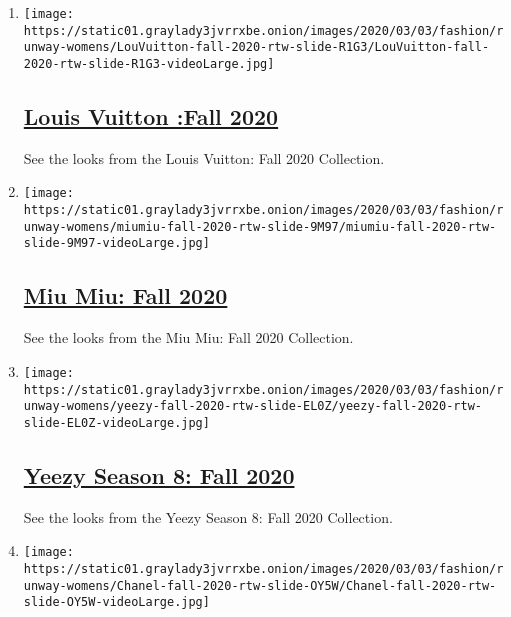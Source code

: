 \begin{enumerate}
\def\labelenumi{\arabic{enumi}.}
\item
  \texttt{[image: https://static01.graylady3jvrrxbe.onion/images/2020/03/03/fashion/runway-womens/LouVuitton-fall-2020-rtw-slide-R1G3/LouVuitton-fall-2020-rtw-slide-R1G3-videoLarge.jpg]}

  \hypertarget{louis-vuitton-fall-2020}{%
  \subsection{\texorpdfstring{\href{/slideshow/2020/03/03/fashion/runway-womens/louis-vuitton-fall-2020.html}{Louis
  Vuitton :Fall
  2020}}{Louis Vuitton :Fall 2020}}\label{louis-vuitton-fall-2020}}

  See the looks from the Louis Vuitton: Fall 2020 Collection.
\item
  \texttt{[image: https://static01.graylady3jvrrxbe.onion/images/2020/03/03/fashion/runway-womens/miumiu-fall-2020-rtw-slide-9M97/miumiu-fall-2020-rtw-slide-9M97-videoLarge.jpg]}

  \hypertarget{miu-miu-fall-2020}{%
  \subsection{\texorpdfstring{\href{/slideshow/2020/03/03/fashion/runway-womens/miu-miu-fall-2020.html}{Miu
  Miu: Fall 2020}}{Miu Miu: Fall 2020}}\label{miu-miu-fall-2020}}

  See the looks from the Miu Miu: Fall 2020 Collection.
\item
  \texttt{[image: https://static01.graylady3jvrrxbe.onion/images/2020/03/03/fashion/runway-womens/yeezy-fall-2020-rtw-slide-EL0Z/yeezy-fall-2020-rtw-slide-EL0Z-videoLarge.jpg]}

  \hypertarget{yeezy-season-8-fall-2020}{%
  \subsection{\texorpdfstring{\href{/slideshow/2020/03/03/fashion/runway-womens/yeezy-season-8-fall-2020.html}{Yeezy
  Season 8: Fall
  2020}}{Yeezy Season 8: Fall 2020}}\label{yeezy-season-8-fall-2020}}

  See the looks from the Yeezy Season 8: Fall 2020 Collection.
\item
  \texttt{[image: https://static01.graylady3jvrrxbe.onion/images/2020/03/03/fashion/runway-womens/Chanel-fall-2020-rtw-slide-OY5W/Chanel-fall-2020-rtw-slide-OY5W-videoLarge.jpg]}


\end{enumerate}
